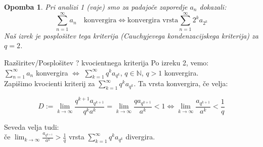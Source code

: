 \documentclass{beamer}
\newtheorem{opomba}{Opomba}
\begin{document}
\begin{frame}
    \begin{opomba}
        Pri analizi 1 (vaje) smo za padajoče zaporedje ${a_n}$ dokazali:
        \[
            \sum_{n = 1}^{\infty}{a_n} \quad \text{konvergira} \iff \text{konvergira vrsta}
            \sum_{n = 1}^{\infty}{2^ka_{2^k}}
        \]
        Naš izrek je posplošitev tega kriterija (Cauchyjevega kondenzacijskega kriterija) za $q = 2$.
    \end{opomba}
\end{frame}


\begin{frame}{Razširitev/Posplošitev ? kvocientnega kriterija}
    Po izreku 2, vemo: \\
    $\sum_{n = 1}^{\infty}{a_n}$ konvergira $\iff$
    $\sum_{k = 1}^{\infty}{q^ka_{q^k}}$, $q \in {\mathbb{N}}$, $q > 1$  konvergira.\\

    Zapišimo kvocienti kriterij za $\sum_{k = 1}^{\infty}{q^ka_{q^k}}$. Ta vrsta konvergira, če velja:

    \pause    
    \[  
        D := 
        \lim_{k \to \infty}{\frac{q^{k + 1}a_{q^{k + 1}}}{q^ka^k}}  =
        \lim_{k \to \infty}{\frac{qa_{q^{k + 1}}}{a^k}} < 1
        \iff
        \lim_{k \to \infty}{\frac{a_{q^{k + 1}}}{a^k}} < \frac{1}{q}
    \]
    
    Seveda velja tudi:\\
    če $\lim_{k \to \infty}{\frac{a_{q^{k + 1}}}{a^k}} > \frac{1}{q}$
    vrsta $\sum_{k = 1}^{\infty}{q^ka_{q^k}}$ divergira.    
\end{frame}
\end{document}
